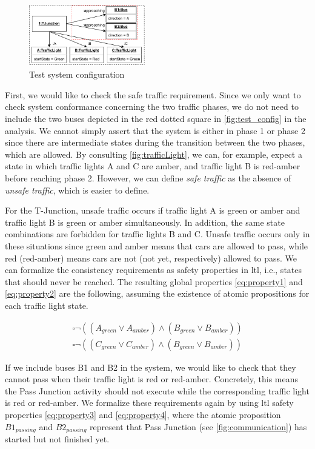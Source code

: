 \documentclass{jot}
\begin{document}
\begin{figure}[h]
    \centering
    \includegraphics[width=0.45\textwidth]{figures/test_config.pdf}
    \caption{Test system configuration}
    \label{fig:test_config}
\end{figure}

First, we would like to check the safe traffic requirement.
Since we only want to check system conformance concerning the two traffic phases, we do not need to include the two buses depicted in the red dotted square in \autoref{fig:test_config} in the analysis.
We cannot simply assert that the system is either in phase 1 or phase 2 since there are intermediate states during the transition between the two phases, which are allowed.
By consulting \autoref{fig:trafficLight}, we can, for example, expect a state in which traffic lights A and C are amber, and traffic light B is red-amber before reaching phase 2.
However, we can define \emph{safe traffic} as the absence of \emph{unsafe traffic}, which is easier to define.

For the T-Junction, unsafe traffic occurs if traffic light A is green or amber and traffic light B is green or amber simultaneously.
In addition, the same state combinations are forbidden for traffic lights B and C.
Unsafe traffic occurs only in these situations since green and amber means that cars are allowed to pass, while red (red-amber) means cars are not (not yet, respectively) allowed to pass.
We can formalize the consistency requirements as safety properties in \gls*{ltl}, i.e., states that should never be reached.
The resulting global properties \ref{eq:property1} and \ref{eq:property2} are the following, assuming the existence of atomic propositions for each traffic light state. 

\begin{align}
    \square\neg((A_{green} \lor A_{amber}) \land (B_{green} \lor B_{amber})) \label{eq:property1} \\
    \square\neg((C_{green} \lor C_{amber}) \land (B_{green} \lor B_{amber})) \label{eq:property2}
\end{align}

If we include buses \textsf{B1} and \textsf{B2} in the system, we would like to check that they cannot pass when their traffic light is red or red-amber.
Concretely, this means the \textsf{Pass Junction} activity should not execute while the corresponding traffic light is \textsf{red} or \textsf{red-amber}.
We formalize these requirements again by using \gls*{ltl} safety properties \ref{eq:property3} and \ref{eq:property4}, where the atomic proposition $B1_{passing}$ and $B2_{passing}$ represent that \textsf{Pass Junction} (see \autoref{fig:communication}) has started but not finished yet. 
\end{document}
